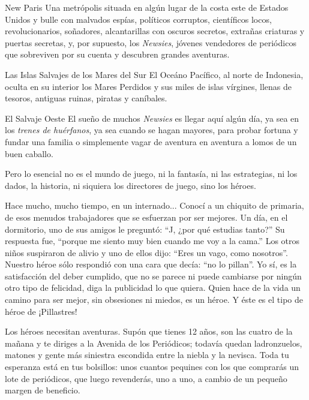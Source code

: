 \begin{description}

\item{New Paris} 
Una metrópolis situada en algún lugar de la costa este de Estados Unidos y bulle con malvados espías, políticos corruptos, científicos locos, revolucionarios, soñadores, alcantarillas con oscuros secretos, extrañas criaturas y puertas secretas, y, por supuesto, los \emph{Newsies}, jóvenes vendedores de periódicos que sobreviven por su cuenta y descubren grandes aventuras.

\item{Las Islas Salvajes de los Mares del Sur}
El Oceáno Pacífico, al norte de Indonesia, oculta en su interior los Mares Perdidos y sus miles de islas vírgines, llenas de tesoros, antiguas ruinas, piratas y caníbales.

\item{El Salvaje Oeste}
El sueño de muchos \emph{Newsies} es llegar aquí algún día, ya sea en los \emph{trenes de huérfanos}, ya sea cuando se hagan mayores, para probar fortuna y fundar una familia o simplemente vagar de aventura en aventura a lomos de un buen caballo.

\end{description}



Pero lo esencial no es el mundo de juego, ni la fantasía, ni las estrategias, ni los dados, la historia, ni siquiera los directores de juego, sino los héroes.


Hace mucho, mucho tiempo, en un internado... Conocí a un chiquito de primaria, de esos menudos trabajadores que se esfuerzan por ser mejores. Un día, en el dormitorio, uno de sus amigos le preguntó: \enquote{J, ¿por qué estudias tanto?} Su respuesta fue, \enquote{porque me siento muy bien cuando me voy a la cama.} Los otros niños suspiraron de alivio y uno de ellos dijo: \enquote{Eres un vago, como nosotros}. Nuestro héroe sólo respondió con una cara que decía: \enquote{no lo pillan}. Yo sí, es la satisfacción del deber cumplido, que no se parece ni puede cambiarse por ningún otro tipo de felicidad, diga la publicidad lo que quiera. Quien hace de la vida un camino para ser mejor, sin obsesiones ni miedos, es un héroe. Y éste es el tipo de héroe de ¡Pillastres!


Los héroes necesitan aventuras. Supón que tienes 12 años, son las cuatro de la mañana y te diriges a la Avenida de los Periódicos; todavía quedan ladronzuelos, matones y gente más siniestra escondida entre la niebla y la nevisca. Toda tu esperanza está en tus bolsillos: unos cuantos pequines con los que comprarás un lote de periódicos, que luego revenderás, uno a uno, a cambio de un pequeño margen de beneficio.

